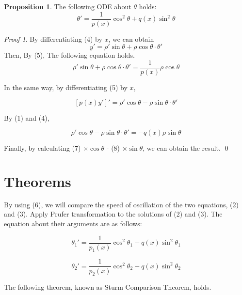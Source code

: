 \documentclass[11pt,a4paper]{amsart}
\theoremstyle{definition}
\newtheorem{prop}{Proposition}
\theoremstyle{definition}
\theoremstyle{remark}
\newtheorem{prf}{Proof}
\begin{document}
\begin{prop}
The following ODE about $\theta$ holds:
\begin{equation}
\displaystyle{ \theta' = \frac{1}{p(x)}\cos^2\theta + q(x)\sin^2\theta }
\end{equation}
\end{prop}
\begin{prf}
By differentiating (4) by $x$, we can obtain
$$y'=\rho' \sin \theta + \rho \cos \theta \cdot \theta'$$
Then, By (5), The following equation holds.
\begin{equation}
\rho' \sin \theta + \rho \cos \theta \cdot \theta' = \frac{1}{p(x)} \rho \cos \theta
\end{equation}

In the same way, by differentiating (5) by $x$,

$$[p(x)y']' = \rho' \cos \theta - \rho \sin \theta \cdot \theta'$$

By (1) and (4),

\begin{equation}
\rho' \cos \theta - \rho \sin \theta \cdot \theta' = -q(x)\rho \sin \theta
\end{equation}

Finally, by calculating (7) $\times \cos \theta$ - (8) $\times \sin \theta$, we can obtain the result.
\qed
\end{prf}

\section{Theorems}

By using (6), we will compare the speed of oscillation of the two equations, (2) and (3).
Apply Prufer transformation to the solutions of (2) and (3). The equation about their arguments are as follows:

\begin{equation}
\displaystyle{ \theta_1' = \frac{1}{p_1(x)}\cos^2\theta_1 + q(x)\sin^2\theta_1 }
\end{equation}

\begin{equation}
\displaystyle{ \theta_2' = \frac{1}{p_2(x)}\cos^2\theta_2 + q(x)\sin^2\theta_2 }
\end{equation}

The following theorem, known as Sturm Comparison Theorem, holds.
\end{document}
